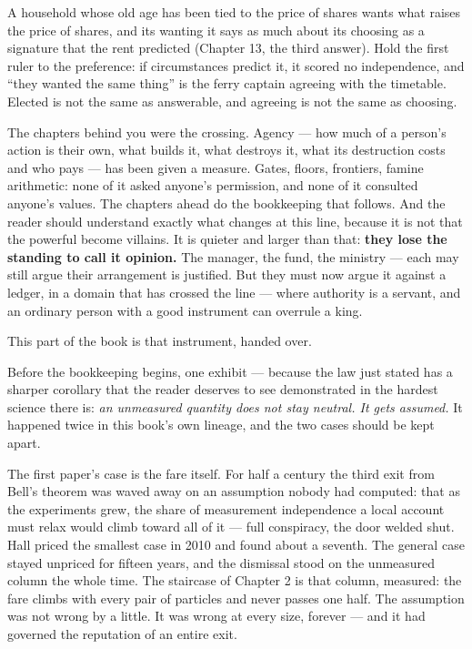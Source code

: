 
A
household whose old age has been tied to the price of shares wants
what raises the price of shares, and its wanting it says as much about
its choosing as a signature that the rent predicted (Chapter 13, the
third answer). Hold the first ruler to the preference: if
circumstances predict it, it scored no independence, and ``they wanted
the same thing'' is the ferry captain agreeing with the timetable.
Elected is not the same as answerable, and agreeing is not the same as
choosing.

The chapters behind you were the crossing. Agency --- how much of a
person's action is their own, what builds it, what destroys it, what
its destruction costs and who pays --- has been given a measure. Gates,
floors, frontiers, famine arithmetic: none of it asked anyone's
permission, and none of it consulted anyone's values. The chapters
ahead do the bookkeeping that follows. And the reader should
understand exactly what changes at this line, because it is not that
the powerful become villains. It is quieter and larger than that:
\textbf{they lose the standing to call it opinion.} The manager, the fund,
the ministry --- each may still argue their arrangement is justified.
But they must now argue it against a ledger, in a domain that has
crossed the line --- where authority is a servant, and an ordinary
person with a good instrument can overrule a king.

This part of the book is that instrument, handed over.


Before the bookkeeping begins, one exhibit --- because the law just
stated has a sharper corollary that the reader deserves to see
demonstrated in the hardest science there is: \emph{an unmeasured quantity
does not stay neutral. It gets assumed.} It happened twice in this
book's own lineage, and the two cases should be kept apart.

The first paper's case is the fare itself. For half a century the third
exit from Bell's theorem was waved away on an assumption nobody had
computed: that as the experiments grew, the share of measurement
independence a local account must relax would climb toward all of
it --- full conspiracy, the door welded shut. Hall priced the smallest
case in 2010 and found about a seventh. The general case stayed unpriced
for fifteen years, and the dismissal stood on the unmeasured column
the whole time. The staircase of Chapter 2 is that column, measured:
the fare climbs with every pair of particles and never passes one
half. The assumption was not wrong by a little. It was wrong at every
size, forever --- and it had governed the reputation of an entire exit.

